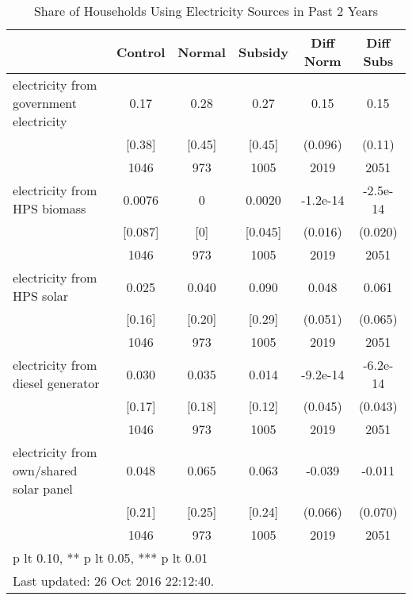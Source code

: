 \begin{table}[htbp]\centering
\def\sym#1{\ifmmode^{#1}\else\(^{#1}\)\fi}
\caption{Share of Households Using Electricity Sources in Past 2 Years \label{tab:"balance"}}
\begin{tabular*}{0.9\hsize}{@{\hskip\tabcolsep\extracolsep\fill}l*{1}{ccccc}}
\toprule
                                &  Control&   Normal&  Subsidy&Diff Norm         &Diff Subs         \\
\midrule
electricity from government electricity&     0.17&     0.28&     0.27&     0.15         &     0.15         \\
                                &   [0.38]&   [0.45]&   [0.45]&  (0.096)         &   (0.11)         \\
                                &     1046&      973&     1005&     2019         &     2051         \\
electricity from HPS biomass    &   0.0076&        0&   0.0020& -1.2e-14         & -2.5e-14         \\
                                &  [0.087]&      [0]&  [0.045]&  (0.016)         &  (0.020)         \\
                                &     1046&      973&     1005&     2019         &     2051         \\
electricity from HPS solar      &    0.025&    0.040&    0.090&    0.048         &    0.061         \\
                                &   [0.16]&   [0.20]&   [0.29]&  (0.051)         &  (0.065)         \\
                                &     1046&      973&     1005&     2019         &     2051         \\
electricity from diesel generator&    0.030&    0.035&    0.014& -9.2e-14         & -6.2e-14         \\
                                &   [0.17]&   [0.18]&   [0.12]&  (0.045)         &  (0.043)         \\
                                &     1046&      973&     1005&     2019         &     2051         \\
electricity from own/shared solar panel&    0.048&    0.065&    0.063&   -0.039         &   -0.011         \\
                                &   [0.21]&   [0.25]&   [0.24]&  (0.066)         &  (0.070)         \\
                                &     1046&      973&     1005&     2019         &     2051         \\
\bottomrule
\multicolumn{6}{l}{\footnotesize * p lt 0.10, ** p lt 0.05, *** p lt 0.01}\\
\multicolumn{6}{l}{\footnotesize Last updated: 26 Oct 2016 22:12:40.}\\
\end{tabular*}
\end{table}
